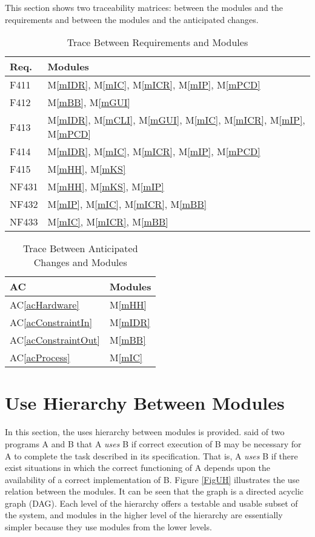 \documentclass[12pt, titlepage]{article}
\newcommand{\acref}[1]{AC\ref{#1}}
\newcommand{\mref}[1]{M\ref{#1}}
\begin{document}
This section shows two traceability matrices: between the modules and the
requirements and between the modules and the anticipated changes.

\begin{table}[H]
\centering
\begin{tabular}{p{} p{}}
\toprule
\textbf{Req.} & \textbf{Modules}\\
\midrule
F411 & \mref{mIDR}, \mref{mIC}, \mref{mICR}, \mref{mIP}, \mref{mPCD}\\
F412 & \mref{mBB}, \mref{mGUI}\\
F413 & \mref{mIDR}, \mref{mCLI}, \mref{mGUI}, \mref{mIC}, \mref{mICR}, \mref{mIP}, \mref{mPCD}\\
F414 & \mref{mIDR}, \mref{mIC}, \mref{mICR}, \mref{mIP}, \mref{mPCD}\\
F415 & \mref{mHH}, \mref{mKS}\\
NF431 & \mref{mHH}, \mref{mKS}, \mref{mIP}\\
NF432 & \mref{mIP}, \mref{mIC}, \mref{mICR}, \mref{mBB}\\
NF433 & \mref{mIC}, \mref{mICR}, \mref{mBB}\\
\bottomrule
\end{tabular}
\caption{Trace Between Requirements and Modules}
\label{TblRT}
\end{table}

\begin{table}[H]
\centering
\begin{tabular}{p{} p{}}
\toprule
\textbf{AC} & \textbf{Modules}\\
\midrule
\acref{acHardware} & \mref{mHH}\\
\acref{acConstraintIn} & \mref{mIDR}\\
\acref{acConstraintOut} & \mref{mBB}\\
\acref{acProcess} & \mref{mIC}\\
\bottomrule
\end{tabular}
\caption{Trace Between Anticipated Changes and Modules}
\label{TblACT}
\end{table}

\section{Use Hierarchy Between Modules} \label{SecUse}

In this section, the uses hierarchy between modules is
provided. \citet{Parnas1978} said of two programs A and B that A {\em uses} B if
correct execution of B may be necessary for A to complete the task described in
its specification. That is, A {\em uses} B if there exist situations in which
the correct functioning of A depends upon the availability of a correct
implementation of B.  Figure \ref{FigUH} illustrates the use relation between
the modules. It can be seen that the graph is a directed acyclic graph
(DAG). Each level of the hierarchy offers a testable and usable subset of the
system, and modules in the higher level of the hierarchy are essentially simpler
because they use modules from the lower levels.
\end{document}
